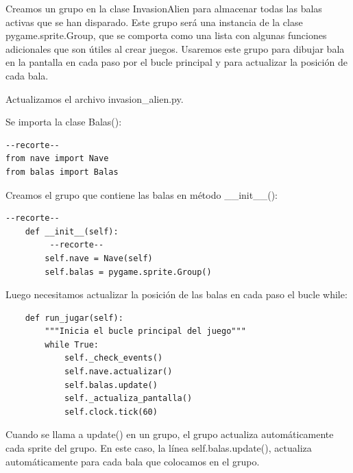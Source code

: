 Creamos un grupo en la clase {\ttfamily InvasionAlien} para almacenar todas las balas activas que se han disparado.
Este grupo será una instancia de la clase  {\ttfamily pygame.sprite.Group}, que se comporta
como una lista con algunas funciones adicionales que son útiles al crear juegos. Usaremos este grupo para dibujar bala
en la pantalla en cada paso por el bucle principal y para actualizar la posición de cada bala.\vspace{0.2cm}

Actualizamos el archivo {\ttfamily invasion\_alien.py}. 

Se  importa la clase  { } {\ttfamily Balas()}:

\hspace{-2.4cm}{\ttfamily \scriptsize invasión}

\vspace{-0.2cm}
\hspace{-2.1cm}{\ttfamily \scriptsize \_alien.py}\vspace{-0.84cm}
\begin{lstlisting}		
--recorte-- 
from nave import Nave
from balas import Balas
\end{lstlisting}
\noindent Creamos el grupo que contiene las balas en método {\ttfamily \_\_init\_\_()}:

\hspace{-2.4cm}{\ttfamily \scriptsize invasión}

\vspace{-0.2cm}
\hspace{-2.1cm}{\ttfamily \scriptsize \_alien.py}\vspace{-0.84cm}
\begin{lstlisting}		
--recorte--
    def __init__(self):
         --recorte-- 
        self.nave = Nave(self)
        self.balas = pygame.sprite.Group()
\end{lstlisting}
\noindent Luego necesitamos actualizar la posición de las balas en cada paso el bucle while:

\hspace{-2.4cm}{\ttfamily \scriptsize invasión}

\vspace{-0.2cm}
\hspace{-2.1cm}{\ttfamily \scriptsize \_alien.py}\vspace{-0.84cm}
\begin{lstlisting}		
    def run_jugar(self):
        """Inicia el bucle principal del juego"""
        while True:
            self._check_events()
            self.nave.actualizar()
            self.balas.update()
            self._actualiza_pantalla()
            self.clock.tick(60)
\end{lstlisting}
\noindent Cuando se llama a  {\ttfamily update()} en un grupo, el grupo  actualiza  automáticamente  cada sprite del grupo.  En este caso, la línea {\ttfamily self.balas.update()}, actualiza  automáticamente para cada bala que colocamos en el grupo.

